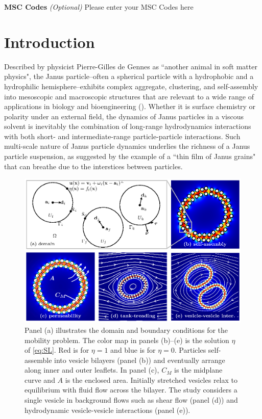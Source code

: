 \documentclass[lineno]{jfm}
\begin{document}
{\bf MSC Codes }  {\it(Optional)} Please enter your MSC Codes here



\section{\label{intro}Introduction}
Described by physicist Pierre-Gilles de Gennes as ``another animal in soft matter physics", the
Janus particle--often a spherical particle with a hydrophobic and a
hydrophilic hemisphere--exhibits complex aggregate, clustering, and
self-assembly into mesoscopic and macroscopic structures that are
relevant to a wide range of applications in biology and bioengineering (\cite{deGennes1991}).
Whether it is surface chemistry or polarity under an external field, the
dynamics of Janus particles in a viscous solvent is inevitably the combination of long-range
hydrodynamics interactions with both short- and intermediate-range 
particle-particle interactions. Such multi-scale nature of Janus particle dynamics underlies 
the richness of a Janus particle suspension, as \cite{deGennes1991} suggested by the example of 
a ``thin film of Janus grains" that can breathe due to the interstices between particles.

\begin{figure}
\begin{center}
\includegraphics[width=\textwidth]{fig1.eps}
\end{center}
\caption{Panel (a) illustrates the domain and boundary conditions for
  the mobility problem. The color map in panels (b)--(e) is the solution 
  $\eta$ of \eqref{eq:SL}. Red is for $\eta  = 1$ and blue is for $\eta  = 0$.
  Particles self-assemble into vesicle bilayers (panel (b)) and
  eventually arrange along inner and outer leaflets. In panel (c), $C_M$
  is the midplane curve and $A$ is the enclosed area.
  Initially stretched vesicles relax to equilibrium with fluid
  flow across the bilayer. The study considers a single vesicle in
  background flows such as shear flow (panel (d)) and hydrodynamic
  vesicle-vesicle interactions (panel (e)).}
\label{fig:figure0}
\end{figure}
\end{document}
